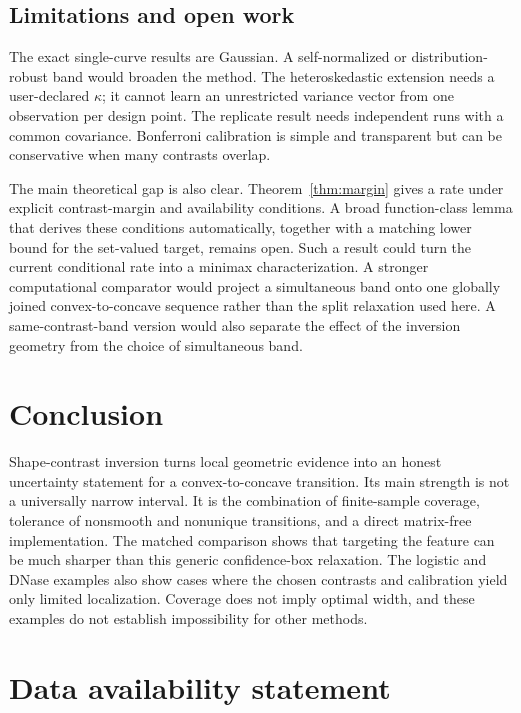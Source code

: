 \documentclass{interact}
\theoremstyle{definition}
\theoremstyle{remark}
\begin{document}
\subsection{Limitations and open work}

The exact single-curve results are Gaussian.  A self-normalized or
distribution-robust band would broaden the method.  The heteroskedastic
extension needs a user-declared $\kappa$; it cannot learn an unrestricted
variance vector from one observation per design point.  The replicate result
needs independent runs with a common covariance.  Bonferroni calibration is
simple and transparent but can be conservative when many contrasts overlap.

The main theoretical gap is also clear.  Theorem~\ref{thm:margin} gives a rate
under explicit contrast-margin and availability conditions.  A broad
function-class lemma that derives these conditions automatically, together
with a matching lower bound for the set-valued target, remains open.  Such a
result could turn the current conditional rate into a minimax characterization.
A stronger computational comparator would project a simultaneous band onto one
globally joined convex-to-concave sequence rather than the split relaxation
used here.  A same-contrast-band version would also separate the effect of the
inversion geometry from the choice of simultaneous band.

\section{Conclusion}

Shape-contrast inversion turns local geometric evidence into an honest
uncertainty statement for a convex-to-concave transition.  Its main strength is
not a universally narrow interval.  It is the combination of finite-sample
coverage, tolerance of nonsmooth and nonunique transitions, and a direct
matrix-free implementation.  The matched comparison shows that targeting the
feature can be much sharper than this generic confidence-box relaxation.  The
logistic and DNase examples also show cases where the chosen contrasts and
calibration yield only limited localization.  Coverage does not imply optimal
width, and these examples do not establish impossibility for other methods.

\section*{Data availability statement}
\end{document}
